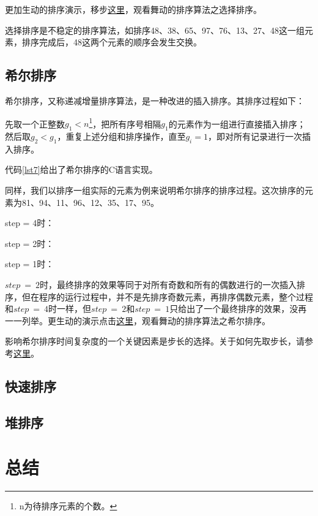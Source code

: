 \documentclass[a4paper, 12pt, titlepage]{article}
\begin{document}
更加生动的排序演示，移步\href{http://v.youku.com/v_show/id_XMjU4NTY5NTcy.html?from=y1.2-1-95.3.3-1.1-1-1-2}{这里}，观看舞动的排序算法之选择排序。

选择排序是不稳定的排序算法，如排序48、38、65、97、76、13、27、48这一组元素，排序完成后，48这两个元素的顺序会发生交换。

\subsection{希尔排序}
希尔排序，又称递减增量排序算法，是一种改进的插入排序。其排序过程如下：

先取一个正整数$g_1 < n$\footnote{n为待排序元素的个数。}，把所有序号相隔$g_1$的元素作为一组进行直接插入排序；然后取$g_2 < g_1$，重复上述分组和排序操作，直至$g_i = 1$，即对所有记录进行一次插入排序。

代码\ref{lst7}给出了希尔排序的C语言实现。
\begin{spacing}{1.0}
  
\end{spacing}

同样，我们以排序一组实际的元素为例来说明希尔排序的排序过程。这次排序的元素为81、94、11、96、12、35、17、95。

step = 4时：


step = 2时：


step = 1时：


$step\ =\ 2$时，最终排序的效果等同于对所有奇数和所有的偶数进行的一次插入排序，但在程序的运行过程中，并不是先排序奇数元素，再排序偶数元素，整个过程和$step\ =\ 4$时一样，但$step\ =\ 2$和$step\ =\ 1$只给出了一个最终排序的效果，没再一一列举。更生动的演示点击\href{http://v.youku.com/v_show/id_XMjU4NTcwMDIw.html}{这里}，观看舞动的排序算法之希尔排序。

影响希尔排序时间复杂度的一个关键因素是步长的选择。关于如何先取步长，请参考\href{http://zh.wikipedia.org/wiki/\%E5\%B8\%8C\%E5\%B0\%94\%E6\%8E\%92\%E5\%BA\%8F#.E6.AD.A5.E9.95.BF.E5.BA.8F.E5.88.97}{这里}。

\subsection{快速排序}
\label{subsec:quick_sort}

\subsection{堆排序}
\label{subsec:heap_sort}

\section{总结}
\end{document}
